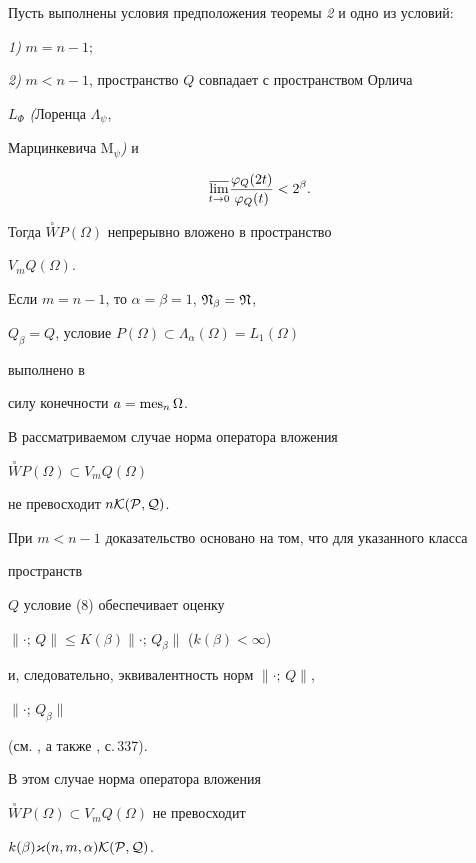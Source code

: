 \begin{thm} 


Пусть выполнены условия предположения теоремы {\em 2} и одно из условий: 


{\em 1)} $m=n-1;$ 


{\em 2)} $m<n-1$, пространство $Q$ совпадает с пространством Орлича 


$L_\Phi$ {\em (}Лоренца $\Lambda_\psi$, 


Марцинкевича $\mathrm M_\psi${\em )} и 


\begin{equation} 




\underset{t\to 0}{\varlimsup}\frac{\varphi_Q(2t)}{\varphi_Q(t)}<2^\beta. 


\end{equation} 


Тогда $\overset{\circ}{W}P(\Omega)$ непрерывно вложено в пространство 


$V_mQ(\Omega)$. 


\end{thm} 


 


\begin{pf} Если $m=n-1$, то $\alpha=\beta=1$, $\frak N_\beta=\frak N$, 


$Q_\beta=Q$, условие $P(\Omega)\subset\Lambda_\alpha(\Omega)=L_1(\Omega)$


выполнено в 


силу конечности $a=\operatorname{mes}_n\Omega$. 


В рассматриваемом случае норма оператора вложения 


$\overset{\circ}{W}P(\Omega)\subset V_mQ(\Omega)$ 


не превосходит $n\cal K(P,Q)$. 


 


При $m<n-1$ доказательство основано на том, что для указанного класса 


пространств 


$Q$ условие (8) обеспечивает оценку 


$\|\cdot;\,Q\|\le K(\beta)\|\cdot;\,Q_\beta\|$ ($k(\beta)<\infty$) 


и, следовательно, эквивалентность норм $\|\cdot;\,Q\|$, 


$\|\cdot;\,Q_\beta\|$ 


(см. \cite{Se}, а также \cite{Kre}, с.\,337). 


В этом случае норма оператора вложения 


$\overset{\circ}{W}P(\Omega)\subset V_mQ(\Omega)$ не превосходит 


$k(\beta)\varkappa(n,m,\alpha)\cal K(P,Q)$. 


\end{pf} 


